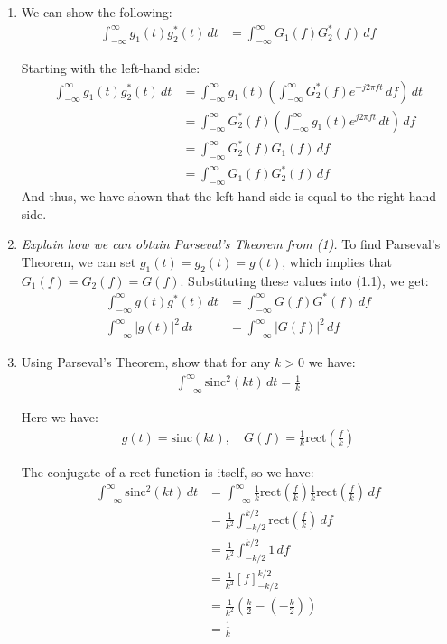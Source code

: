 \documentclass{article}
\begin{document}
\begin{enumerate}[label=1.\arabic*]
    \item We can show the following:
    \begin{align*}
        \int_{-\infty}^{\infty} g_1(t)g_2^*(t) \, dt &= \int_{-\infty}^{\infty} G_1(f)G_2^*(f) \, df
    \end{align*}

    Starting with the left-hand side:
    \begin{align*}
        \int_{-\infty}^{\infty} g_1(t)g_2^*(t) \, dt &= \int_{-\infty}^{\infty} g_1(t) \left( \int_{-\infty}^{\infty} G_2^*(f)e^{-j2\pi ft} \, df \right) \, dt \\
        &= \int_{-\infty}^{\infty} G_2^*(f) \left( \int_{-\infty}^{\infty} g_1(t)e^{j2\pi ft} \, dt \right) \, df \\
        &= \int_{-\infty}^{\infty} G_2^*(f)G_1(f) \, df \\
        &= \int_{-\infty}^{\infty} G_1(f)G_2^*(f) \, df
    \end{align*}
    And thus, we have shown that the left-hand side is equal to the right-hand side.

    \item \textit{Explain how we can obtain Parseval's Theorem from (1).}
    To find Parseval's Theorem, we can set $g_1(t) = g_2(t) = g(t)$, which implies that $G_1(f) = G_2(f) = G(f)$. Substituting these values into (1.1), we get:
    \begin{align*}
        \int_{-\infty}^{\infty} g(t)g^*(t) \, dt &= \int_{-\infty}^{\infty} G(f)G^*(f) \, df \\
        \int_{-\infty}^{\infty} |g(t)|^2 \, dt &= \int_{-\infty}^{\infty} |G(f)|^2 \, df
    \end{align*}
    \item Using Parseval's Theorem, show that for any $k>0$ we have:
    \begin{align*}
        \int_{-\infty}^{\infty} \text{sinc}^2(kt) \, dt = \frac{1}{k}
    \end{align*}

    Here we have:
    \begin{align*}
        g(t) = \text{sinc}(kt), \quad G(f) = \frac{1}{k}\text{rect}\left(\frac{f}{k}\right)
    \end{align*}

    The conjugate of a rect function is itself, so we have:
    \begin{align*}
        \int_{-\infty}^{\infty} \text{sinc}^2(kt) \, dt &= \int_{-\infty}^{\infty} \frac{1}{k}\text{rect}\left(\frac{f}{k}\right)\frac{1}{k}\text{rect}\left(\frac{f}{k}\right) \, df \\
        &= \frac{1}{k^2}\int_{-k/2}^{k/2} \text{rect}\left(\frac{f}{k}\right) \, df \\
        &= \frac{1}{k^2}\int_{-k/2}^{k/2} 1 \, df \\
        &= \frac{1}{k^2}\left[ f \right]_{-k/2}^{k/2} \\
        &= \frac{1}{k^2}\left( \frac{k}{2} - \left( -\frac{k}{2} \right) \right) \\
        &= \frac{1}{k}
    \end{align*}


\end{enumerate}
\end{document}
